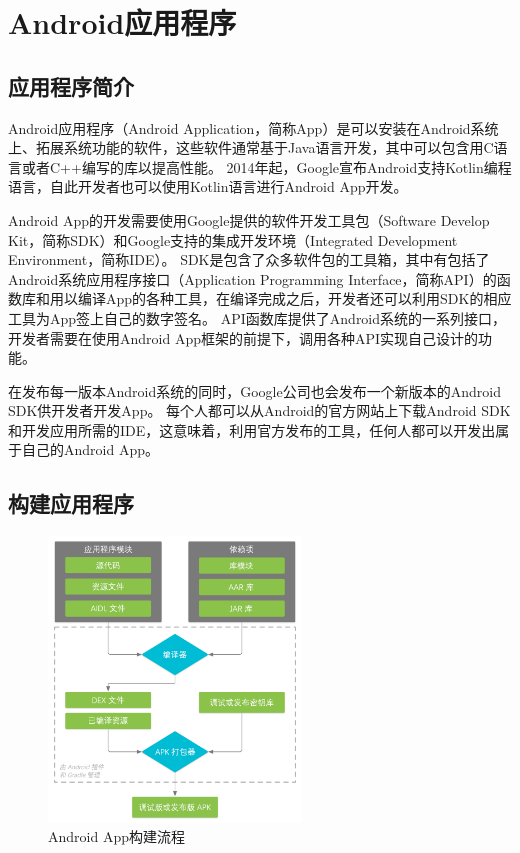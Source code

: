 \section{Android应用程序}

\subsection{应用程序简介}

Android应用程序（Android Application，简称App）是可以安装在Android系统上、拓展系统功能的软件，这些软件通常基于Java语言开发，其中可以包含用C语言或者C++编写的库以提高性能。
2014年起，Google宣布Android支持Kotlin编程语言，自此开发者也可以使用Kotlin语言进行Android App开发。

Android App的开发需要使用Google提供的软件开发工具包（Software Develop Kit，简称SDK）和Google支持的集成开发环境（Integrated Development Environment，简称IDE）。
SDK是包含了众多软件包的工具箱，其中有包括了Android系统应用程序接口（Application Programming Interface，简称API）的函数库和用以编译App的各种工具，在编译完成之后，开发者还可以利用SDK的相应工具为App签上自己的数字签名。
API函数库提供了Android系统的一系列接口，开发者需要在使用Android App框架的前提下，调用各种API实现自己设计的功能。

在发布每一版本Android系统的同时，Google公司也会发布一个新版本的Android SDK供开发者开发App。
每个人都可以从Android的官方网站上下载Android SDK和开发应用所需的IDE，这意味着，利用官方发布的工具，任何人都可以开发出属于自己的Android App。

\subsection{构建应用程序}

\begin{figure}
	\centering
	\includegraphics[width=0.6\textwidth]{./Figures/edwin-build-process-CHN.png}
	\caption{Android App构建流程}
	\label{fig:Android-Build-Process}
\end{figure}

